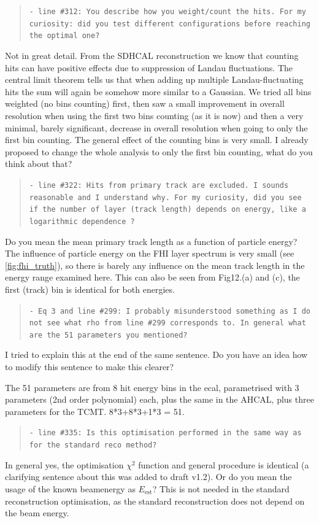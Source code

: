 \documentclass[twoside,a4paper,12pt]{article}
\begin{document}
\begin{quote}\texttt{- line \#312:
You describe how you weight/count the hits. 
For my curiosity: did you test different configurations before reaching the optimal one?}\end{quote}
Not in great detail. From the SDHCAL reconstruction we know that counting hits can have positive effects due to suppression of Landau fluctuations. The central limit theorem tells us that when adding up multiple Landau-fluctuating hits the sum will again be somehow more similar to a Gaussian. We tried all bins weighted (no bins counting) first, then saw a small improvement in overall resolution when using the first two bins counting (as it is now) and then a very minimal, barely significant, decrease in overall resolution when going to only the first bin counting. The general effect of the counting bins is very small. I already proposed to change the whole analysis to only the first bin counting, what do you think about that?

\begin{quote}\texttt{- line \#322:
Hits from primary track are excluded. I sounds reasonable and I understand why.
For my curiosity, did you see if the number of layer (track length) depends on energy, like a logarithmic dependence ?}\end{quote}
Do you mean the mean primary track length as a function of particle energy? The influence of particle energy on the FHI layer spectrum is very small (see \autoref{fig:fhi_truth}), so there is barely any influence on the mean track length in the energy range examined here. This can also be seen from Fig12.(a) and (c), the first (track) bin is identical for both energies.

\begin{quote}\texttt{- Eq 3 and line \#299:
I probably misunderstood something as I do not see what rho from line \#299 corresponds to.
In general what are the 51 parameters you mentioned?}\end{quote}
I tried to explain this at the end of the same sentence. Do you have an idea how to modify this sentence to make this clearer?

The 51 parameters are from 8 hit energy bins in the ecal, parametrised with 3 parameters (2nd order polynomial) each, plus the same in the AHCAL, plus three parameters for the TCMT. 8*3+8*3+1*3 = 51. 

\begin{quote}\texttt{- line \#335:
Is this optimisation performed in the same way as for the standard reco method?}\end{quote}
In general yes, the optimisation $\chi^2$ function and general procedure is identical (a clarifying sentence about this was added to draft v1.2). Or do you mean the usage of the known beamenergy as $E_\text{est}$? This is not needed in the standard reconstruction optimisation, as the standard reconstruction does not depend on the beam energy.
\end{document}
